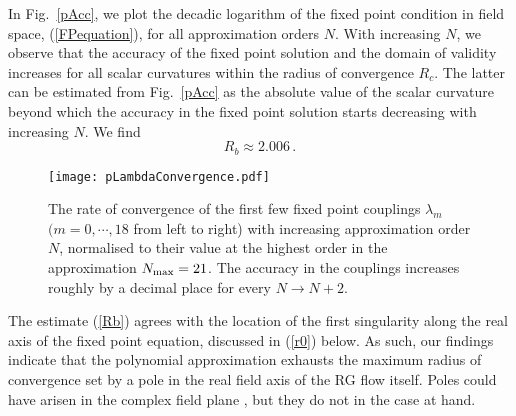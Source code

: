 \documentclass[notitlepage,eqsecnum,bm,amsmath,preprintnumbers,superscriptaddress,nofootinbib,aps,11pt]{revtex4-1}
\def\eq#1{(\ref{#1})}
\def\R{\rho}
\def\R{R}
\begin{document}
In Fig.~\ref{pAcc}, we plot the decadic logarithm of the fixed point condition in field space, \eq{FPequation}, for all approximation orders $N$. With increasing $N$, we observe that the accuracy of the fixed point solution and the domain of validity increases for all scalar curvatures within the radius of convergence $\R_c$. The latter can be estimated from  Fig.~\ref{pAcc} as the absolute value of the scalar curvature beyond which the accuracy in the fixed point solution starts decreasing with increasing $N$. We find 
\begin{equation}\label{Rb}
\R_b\approx 2.006\,.
\end{equation}
\begin{figure}[t]
\centering
\begin{center}
\texttt{[image: pLambdaConvergence.pdf]}
\caption{\label{pLambdaConvergence} The rate of convergence of the first few fixed point couplings $\lambda_m$ $
(m=0,\cdots,18$ from left to right) with increasing approximation order $N$, normalised to their value at the 
highest order in the approximation $N_{\rm max}=21$. The accuracy in the couplings increases roughly by a decimal place for every $N\to N+2$.}
\end{center}
\end{figure}
The estimate \eq{Rb}  agrees with the location of the first singularity along the real axis of the fixed point equation, discussed in \eq{r0} below. As such, our findings indicate that the polynomial approximation exhausts the maximum radius of convergence set by a pole in the real field axis of the RG flow itself. Poles could have arisen in the complex field plane \cite{Falls:2016wsa,Morris:1994ki,Litim:2002cf,Litim:2016hlb,Juttner:2017cpr,Marchais:2017jqc}, but they do not in the case at hand. 


 
 
\end{document}
